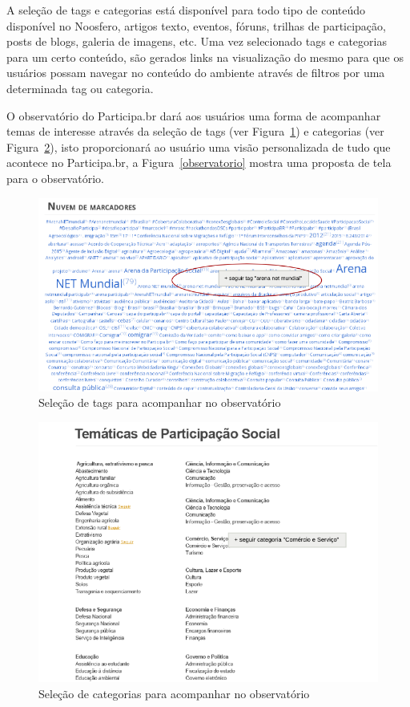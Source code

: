 \documentclass[12pt]{article}
\begin{document}
A seleção de tags e categorias está disponível para todo tipo de conteúdo
disponível no Noosfero, artigos texto, eventos, fóruns, trilhas de
participação, posts de blogs, galeria de imagens, etc. Uma vez selecionado
tags e categorias para um certo conteúdo, são gerados links na visualização do
mesmo para que os usuários possam navegar no conteúdo do ambiente através de
filtros por uma determinada tag ou categoria.

O observatório do Participa.br dará aos usuários uma forma de acompanhar temas
de interesse através da seleção de tags (ver Figura~\ref{observatorio-tags}) e
categorias (ver Figura~\ref{observatorio-categorias}), isto proporcionará ao
usuário uma visão personalizada de tudo que acontece no Participa.br, a
Figura~\ref{observatorio} mostra uma proposta de tela para o observatório.

\begin{figure}[h]
\center
\includegraphics[scale=0.5]{observatorio-seguir-tags.png}
\caption{Seleção de tags para acompanhar no observatório}
\label{observatorio-tags}
\end{figure}

\begin{figure}[h]
\center
\includegraphics[scale=0.5]{observatorio-categoria.png}
\caption{Seleção de categorias para acompanhar no observatório}
\label{observatorio-categorias}
\end{figure}
\end{document}
